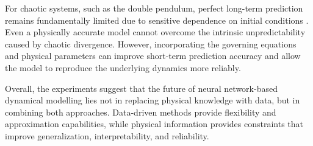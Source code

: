 For chaotic systems, such as the double pendulum, perfect long-term prediction remains fundamentally limited due to sensitive dependence on initial conditions \cite{lorenz1963deterministic}. Even a physically accurate model cannot overcome the intrinsic unpredictability caused by chaotic divergence. However, incorporating the governing equations and physical parameters can improve short-term prediction accuracy and allow the model to reproduce the underlying dynamics more reliably.

Overall, the experiments suggest that the future of neural network-based dynamical modelling lies not in replacing physical knowledge with data, but in combining both approaches. Data-driven methods provide flexibility and approximation capabilities, while physical information provides constraints that improve generalization, interpretability, and reliability.
